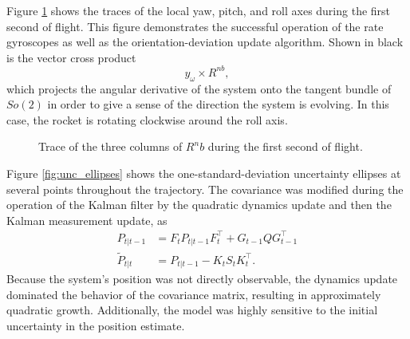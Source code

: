 \documentclass{article}
\begin{document}
Figure \ref{fig:sphere} shows the traces of the local yaw, pitch, and roll axes during the first second of flight. This figure demonstrates the successful operation of the rate gyroscopes as well as the orientation-deviation update algorithm. Shown in black is the vector cross product
\[
y_\omega \times R^{nb},
\]
which projects the angular derivative of the system onto the tangent bundle of $So(2)$ in order to give a sense of the direction the system is evolving. In this case, the rocket is rotating clockwise around the roll axis.
\begin{figure}[htbp]%
    \centering
    \caption{Trace of the three columns of $R^nb$ during the first second of flight.}%
    \label{fig:sphere}
\end{figure}

Figure \ref{fig:unc_ellipses} shows the one-standard-deviation uncertainty ellipses at several points throughout the trajectory. The covariance was modified during the operation of the Kalman filter by the quadratic dynamics update and then the Kalman measurement update, as 
\begin{align*}
    P_{t | t-1} &= F_t P_{t | t-1} F_t^\top + G_{t-1} Q G_{t-1}^\top\\
    \tilde{P}_{t|t} &= P_{t | t-1} - K_t S_t K_t^\top.
\end{align*}
Because the system's position was not directly observable, the dynamics update dominated the behavior of the covariance matrix, resulting in approximately quadratic growth. Additionally, the model was highly sensitive to the initial uncertainty in the position estimate.
\end{document}

